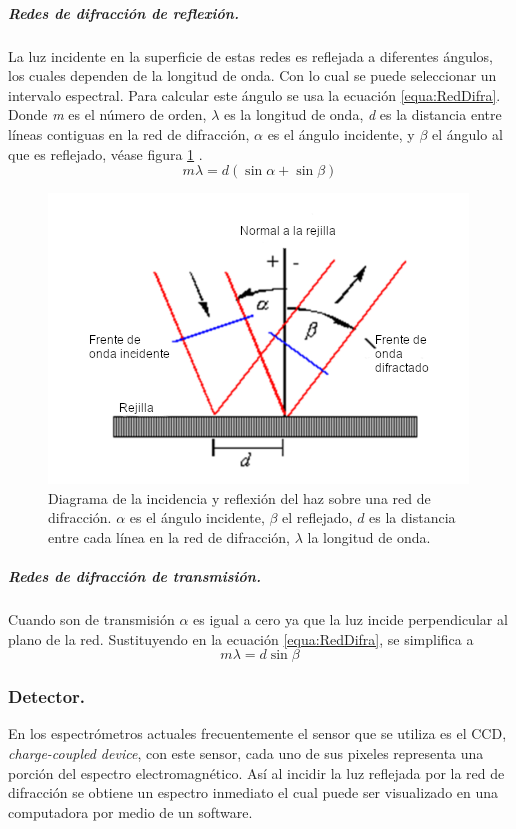 \subparagraph{Redes de difracción de reflexión.}
La luz incidente en la superficie de estas redes es reflejada a diferentes ángulos, los cuales dependen de la longitud de onda. Con lo cual se puede seleccionar un intervalo espectral. Para calcular este ángulo se usa la ecuación \ref{equa:RedDifra}. Donde \textit{m} es el número de orden, $\lambda$ es la longitud de onda, \textit{d} es la distancia entre líneas contiguas en la red de difracción, $\alpha$ es el ángulo incidente, y $\beta$ el ángulo al que es reflejado, véase figura \ref{fig:reflexion} \cite{Excel2000}.
\begin{equation}
	m\lambda = d(\sin\alpha + \sin\beta)
	\label{equa:RedDifra}
\end{equation}
\begin{figure}[h]
	\centering
	\includegraphics[width=0.6\linewidth]{Imagenes/reflexion}
	\caption{Diagrama de la incidencia y reflexión del haz sobre una red de difracción. $\alpha$ es el ángulo incidente, $\beta$ el reflejado, $d$  es la distancia entre cada línea en la red de difracción, $\lambda$ la longitud de onda. \cite{Excel2000}}
	\label{fig:reflexion}
\end{figure}


\subparagraph{Redes de difracción de transmisión.}
Cuando son de transmisión $\alpha$ es igual a cero ya que la luz incide perpendicular al plano de la red. Sustituyendo en la ecuación \ref{equa:RedDifra}, se simplifica a
\begin{equation}
m\lambda = d\sin\beta
\label{equa:difra}
\end{equation}
\subsubsection{Detector.}
En los espectrómetros actuales frecuentemente el sensor que se utiliza es el CCD, \textit{charge-coupled device}, con este sensor, cada uno de sus pixeles representa una porción del espectro electromagnético. Así al incidir la luz reflejada por la red de difracción se obtiene un espectro inmediato el cual puede ser visualizado en una computadora por medio de un software.

